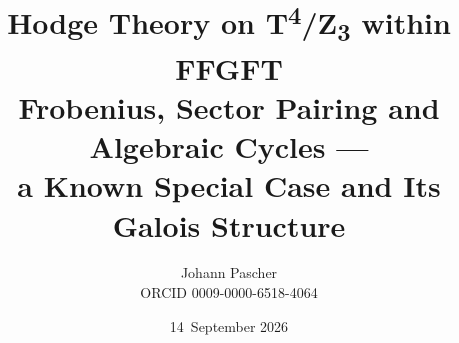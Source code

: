 \documentclass[11pt,a4paper]{report}
\title{Hodge Theory on T\textsuperscript{4}/Z\textsubscript{3} within FFGFT\\[0.5em]
  \large Frobenius, Sector Pairing and Algebraic Cycles ---\\ a Known Special Case and Its Galois Structure}
\date{14~September 2026}
\author{Johann Pascher\\\small ORCID 0009-0000-6518-4064}
\begin{document}
\renewcommand{\thechapter}{}
\renewcommand{\thesection}{\arabic{section}}
\maketitle
\tableofcontents

\end{document}
